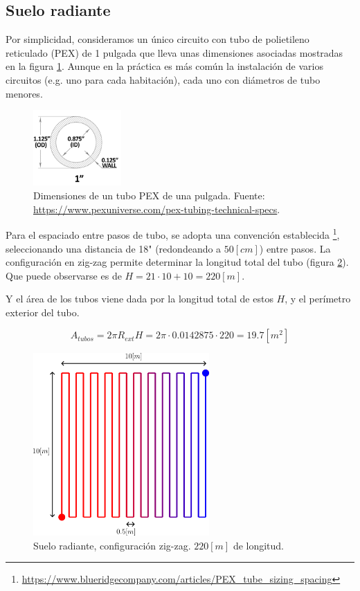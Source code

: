 \subsection{Suelo radiante}

Por simplicidad, consideramos un único circuito con tubo de polietileno reticulado (PEX) de 1
pulgada que lleva unas dimensiones asociadas mostradas en la figura
\ref{fig:1_inch_pex}.
Aunque en la práctica es más común la instalación de varios circuitos (e.g.
uno para cada habitación), cada uno con diámetros de tubo menores.

\begin{figure}[h] \centering
	\centering
	\includegraphics[width=0.3\textwidth]{./capitulos/resultados_discusion/images/1_inch_pex.png}
	\caption{Dimensiones de un tubo PEX de una pulgada. Fuente: \url{https://www.pexuniverse.com/pex-tubing-technical-specs}.}
	\label{fig:1_inch_pex}
\end{figure}


Para el espaciado entre pasos de tubo, se adopta una convención establecida
\footnote{\url{https://www.blueridgecompany.com/articles/PEX_tube_sizing_spacing}},
seleccionando una distancia de 18" (redondeando a $50[cm]$) entre pasos. La
configuración en zig-zag permite determinar la longitud total del tubo (figura
\ref{fig:esquema_tubos_suelo}). Que puede observarse es de $H = 21 \cdot 10 + 10 =
220[m]$.

Y el área de los tubos viene dada por la longitud total de estos $H$, y el
perímetro exterior del tubo.

\begin{equation}
	A_{tubos} = 2 \pi R_{ext} H = 2 \pi \cdot 0.0142875 \cdot 220 = 19.7[m^2]
\end{equation}


\begin{figure}[h] \centering
	\centering
	\includegraphics[width=0.6\textwidth]{./capitulos/resultados_discusion/images/esquema_tubos_suelo.png}
	\caption{Suelo radiante, configuración zig-zag. $220[m]$ de longitud.}
	\label{fig:esquema_tubos_suelo}
\end{figure}

